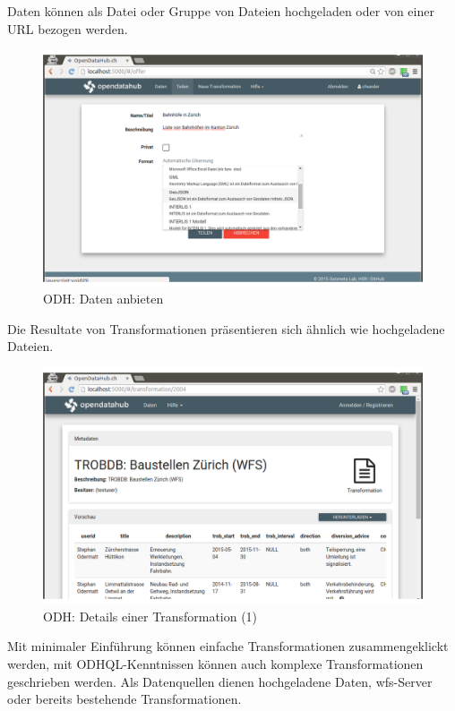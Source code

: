 Daten können als Datei oder Gruppe von Dateien hochgeladen oder von einer URL bezogen werden.

\begin{figure}[H]
    \centering
    \includegraphics[width=2\linewidth/3]{fig/odh-offer-data}
    \caption{ODH: Daten anbieten}
\end{figure}

Die Resultate von Transformationen präsentieren sich ähnlich wie hochgeladene Dateien.

\begin{figure}[H]
    \centering
    \includegraphics[width=2\linewidth/3]{fig/odh-transformation-detail}
    \caption{ODH: Details einer Transformation (1)}
\end{figure}

Mit minimaler Einführung können einfache Transformationen zusammengeklickt werden, mit ODHQL-Kenntnissen können auch komplexe Transformationen geschrieben werden. Als Datenquellen dienen hochgeladene Daten, \acs{wfs}-Server oder bereits bestehende Transformationen.

